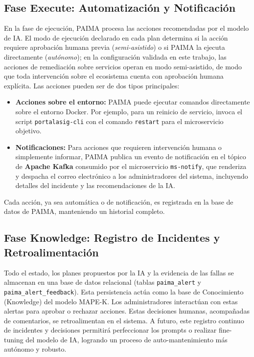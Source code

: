 \subsection{Fase Execute: Automatización y Notificación}

En la fase de ejecución, PAIMA procesa las acciones recomendadas por el modelo de
IA. El modo de ejecución declarado en cada plan determina si la acción requiere
aprobación humana previa (\textit{semi-asistido}) o si PAIMA la ejecuta
directamente (\textit{autónomo}); en la configuración validada en este trabajo,
las acciones de remediación sobre servicios operan en modo semi-asistido, de modo
que toda intervención sobre el ecosistema cuenta con aprobación humana explícita.
Las acciones pueden ser de dos tipos principales:
\begin{itemize}
    \item \textbf{Acciones sobre el entorno:} PAIMA puede ejecutar comandos
directamente sobre el entorno Docker. Por ejemplo, para un reinicio de servicio,
invoca el script \texttt{portalasig-cli} con el
comando \texttt{restart} para el microservicio objetivo.
    \item \textbf{Notificaciones:} Para acciones que requieren intervención humana
o simplemente informar, PAIMA publica un evento de notificación en el tópico de
\textbf{Apache Kafka} consumido por el microservicio
\texttt{ms-notify}, que renderiza y despacha el correo electrónico a los
administradores del sistema, incluyendo detalles del incidente y las
recomendaciones de la IA.
\end{itemize}
Cada acción, ya sea automática o de notificación, es registrada en la base de datos
de PAIMA, manteniendo un historial completo.

\subsection{Fase Knowledge: Registro de Incidentes y Retroalimentación}

Todo el estado, los planes propuestos por la IA y la evidencia de las fallas se
almacenan en una base de datos relacional (tablas \texttt{paima\_alert} y
\texttt{paima\_alert\_feedback}). Esta persistencia actúa como la base de
Conocimiento (Knowledge) del modelo MAPE-K. Los administradores interactúan con
estas alertas para aprobar o rechazar acciones. Estas decisiones humanas,
acompañadas de comentarios, se retroalimentan en el sistema. A futuro, este registro
continuo de incidentes y decisiones permitirá perfeccionar los prompts o realizar
fine-tuning del modelo de IA, logrando un proceso de auto-mantenimiento más
autónomo y robusto.

